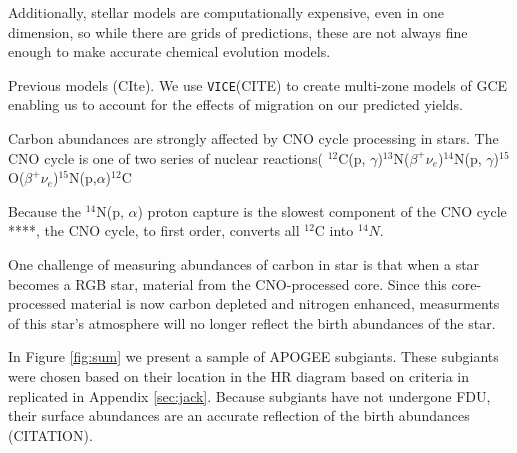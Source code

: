 \documentclass[fleqn,usenatbib]{mnras}
\newcommand{\VICE}{\texttt{VICE}}
\begin{document}
Additionally, stellar models are computationally expensive, even in one dimension, so while there are grids of predictions, these are not always fine enough to make accurate chemical evolution models. 

Previous models (CIte). We use \VICE (CITE) to create multi-zone models of GCE enabling us to account for the effects of migration on our predicted yields. 

\citet{prantzos+18}
\citep{WAF17}
\citep{james+21}
\citep{fiorenzo+21}


\citep[e.g.][]{james+22}

Carbon abundances are strongly affected by CNO cycle processing in stars. The CNO cycle is one of two series of nuclear reactions( $^{12}$C(p, $\gamma$)$^{13}$N($\beta^+ \nu_e$)$^{14}$N(p, $\gamma$)$^{15}$O($\beta^+\nu_e$)$^{15}$N(p,$\alpha$)$^{12}$C

Because the $^{14}$N(p, $\alpha$) proton capture is the slowest component of the CNO cycle ****, the CNO cycle, to first order, converts all $^{12}$C into $^{14}N$. 

One challenge of measuring abundances of carbon in star is that when a star becomes a RGB star, material from the CNO-processed core. Since this core-processed material is now carbon depleted and nitrogen enhanced, measurments of this star's atmosphere will no longer reflect the birth abundances of the star.

In Figure \ref{fig:sum} we present a sample of APOGEE subgiants. These subgiants were chosen based on their location in the HR diagram based on criteria in \citet{jack_subgiant} replicated in Appendix \ref{sec:jack}. Because subgiants have not undergone FDU, their surface abundances are an accurate reflection of the birth abundances (CITATION).  
\end{document}
